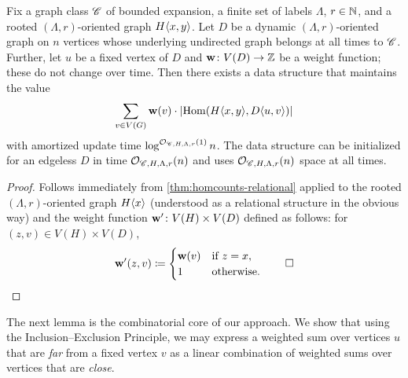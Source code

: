 \begin{lemma}\label{lem:dyn-rooted-homs}
	Fix a graph class $\mathscr C$ of bounded expansion, a finite set of labels $\Lambda$, $r\in \mathbb{N}$, and a rooted $(\Lambda,r)$-oriented graph $H\langle x,y\rangle$. Let $D$ be a dynamic $(\Lambda,r)$-oriented graph on $n$ vertices whose underlying undirected graph belongs at all times to $\mathscr C$. Further, let $u$ be a fixed vertex of $D$ and $\mathbf{w}\colon V(D)\to \mathbb{Z}$ be a weight function; these do not change over time. Then there exists a data structure that maintains the value
	\[\sum_{v\in V(G)} \mathbf{w}(v)\cdot |\mathrm{Hom}(H\langle x,y\rangle,D\langle u,v\rangle)|\]
	with amortized update time $\log^{\mathcal{O}_{\mathscr C,H,\Lambda,r}(1)} n$. The data structure can be initialized for an edgeless $D$ in time $\mathcal{O}_{\mathscr C,H,\Lambda,r}(n)$ and uses $\mathcal{O}_{\mathscr C,H,\Lambda,r}(n)$ space at all times.
\end{lemma}
\begin{proof}
	Follows immediately from \cref{thm:homcounts-relational} applied to the rooted $(\Lambda,r)$-oriented graph $H\langle x\rangle$ (understood as a relational structure in the obvious way) and the weight function $\mathbf{w}'\colon V(H)\times V(D)$ defined as follows: for $(z,v)\in V(H)\times V(D)$,
	\[\mathbf{w}'(z,v)\coloneqq \begin{cases}\mathbf{w}(v) &\textrm{if }z=x,\\ 1 & \textrm{otherwise.}\end{cases}\qed\]
\end{proof}

The next lemma is the combinatorial core of our approach. We show that using the Inclusion--Exclusion Principle, we may express a weighted sum over vertices $u$ that are \emph{far} from a fixed vertex $v$ as a linear combination of weighted sums over vertices that are \emph{close}.

